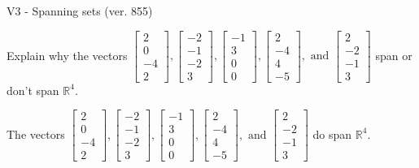 \begin{exercise}
  \begin{exerciseTitle}V3 - Spanning sets (ver. 855)\end{exerciseTitle}
  \begin{exerciseStatement}
    Explain why the vectors \(\left[\begin{array}{r}
2 \\
0 \\
-4 \\
2
\end{array}\right] , \left[\begin{array}{r}
-2 \\
-1 \\
-2 \\
3
\end{array}\right] , \left[\begin{array}{r}
-1 \\
3 \\
0 \\
0
\end{array}\right] , \left[\begin{array}{r}
2 \\
-4 \\
4 \\
-5
\end{array}\right] , \text{ and } \left[\begin{array}{r}
2 \\
-2 \\
-1 \\
3
\end{array}\right]\) span or don't span \(\mathbb{R}^4\). 
	


  \end{exerciseStatement}
  \begin{exerciseAnswer}
   The vectors \(\left[\begin{array}{r}
2 \\
0 \\
-4 \\
2
\end{array}\right] , \left[\begin{array}{r}
-2 \\
-1 \\
-2 \\
3
\end{array}\right] , \left[\begin{array}{r}
-1 \\
3 \\
0 \\
0
\end{array}\right] , \left[\begin{array}{r}
2 \\
-4 \\
4 \\
-5
\end{array}\right] , \text{ and } \left[\begin{array}{r}
2 \\
-2 \\
-1 \\
3
\end{array}\right]\) 
  	 do  
	span \(\mathbb{R}^4\).
  



\end{exerciseAnswer}
\end{exercise}
